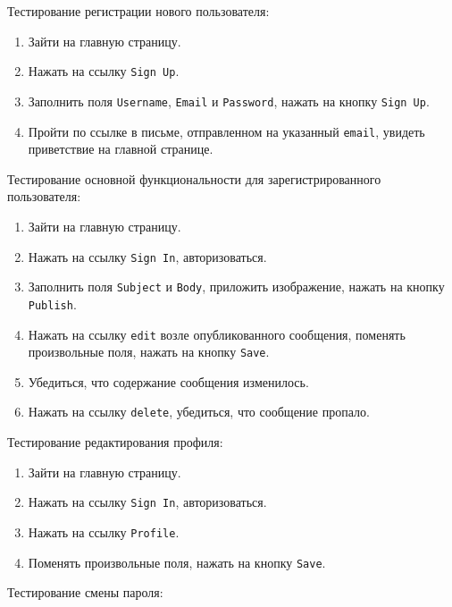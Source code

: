 \documentclass[oneside, final, 14pt]{extarticle}
\begin{document}
Тестирование регистрации нового пользователя:

\begin{enumerate}
\item{Зайти на главную страницу.}
\item{Нажать на ссылку \texttt{Sign Up}.}
\item{Заполнить поля \texttt{Username}, \texttt{Email} и \texttt{Password}, нажать на кнопку \texttt{Sign Up}.}
\item{Пройти по ссылке в письме, отправленном на указанный \texttt{email}, увидеть приветствие на главной странице.}
\end{enumerate}

\vspace{0.5cm}

Тестирование основной функциональности для зарегистрированного пользователя:

\begin{enumerate}
\item{Зайти на главную страницу.}
\item{Нажать на ссылку \texttt{Sign In}, авторизоваться.}
\item{Заполнить поля \texttt{Subject} и \texttt{Body}, приложить изображение, нажать на кнопку \texttt{Publish}.}
\item{Нажать на ссылку \texttt{edit} возле опубликованного сообщения, поменять произвольные поля, нажать на кнопку \texttt{Save}.}
\item{Убедиться, что содержание сообщения изменилось.}
\item{Нажать на ссылку \texttt{delete}, убедиться, что сообщение пропало.}
\end{enumerate}

\vspace{0.5cm}

Тестирование редактирования профиля:

\begin{enumerate}
\item{Зайти на главную страницу.}
\item{Нажать на ссылку \texttt{Sign In}, авторизоваться.}
\item{Нажать на ссылку \texttt{Profile}.}
\item{Поменять произвольные поля, нажать на кнопку \texttt{Save}.}
\end{enumerate}

\vspace{0.5cm}

Тестирование смены пароля:
\end{document}
